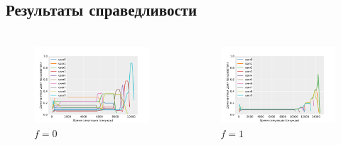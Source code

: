 \documentclass[t]{beamer}  %
\begin{document}
\subsection{Результаты справедливости}

\begin{frame}[fragile]
	\frametitle{\insertsection} 
	\framesubtitle{\insertsubsection}

	\vspace{-0.5cm}
	
	\begin{columns}
		\begin{column}{0.65\linewidth}
			\begin{figure}[H]
				\centering 
					\includegraphics[width=\linewidth]{images/fair_share_0}
					\caption*{$f = 0$}
				\end{figure}
		\end{column}
		\hspace{-1cm}
		\begin{column}{0.65\linewidth}
			\begin{figure}[H]
				\centering 
					\includegraphics[width=\linewidth]{images/fair_share_1}
					\caption*{$f = 1$}
				\end{figure}
		\end{column}
	\end{columns}

	
\end{frame}
\end{document}
